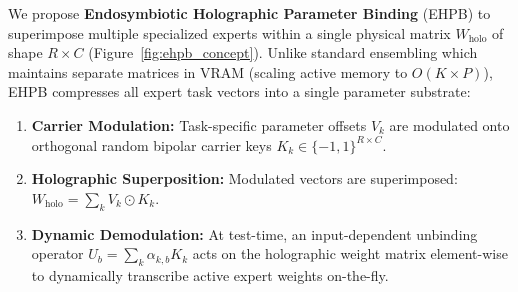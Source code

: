 We propose \textbf{Endosymbiotic Holographic Parameter Binding} (EHPB) to superimpose multiple specialized experts within a single physical matrix $W_{\text{holo}}$ of shape $R \times C$ (Figure~\ref{fig:ehpb_concept}). Unlike standard ensembling which maintains separate matrices in VRAM (scaling active memory to $O(K \times P)$), EHPB compresses all expert task vectors into a single parameter substrate:
\begin{enumerate}
\item \textbf{Carrier Modulation:} Task-specific parameter offsets $V_k$ are modulated onto orthogonal random bipolar carrier keys $K_k \in \{-1, 1\}^{R \times C}$.
\item \textbf{Holographic Superposition:} Modulated vectors are superimposed: $W_{\text{holo}} = \sum_k V_k \odot K_k$.
\item \textbf{Dynamic Demodulation:} At test-time, an input-dependent unbinding operator $U_b = \sum_k \alpha_{k, b} K_k$ acts on the holographic weight matrix element-wise to dynamically transcribe active expert weights on-the-fly.
\end{enumerate}

